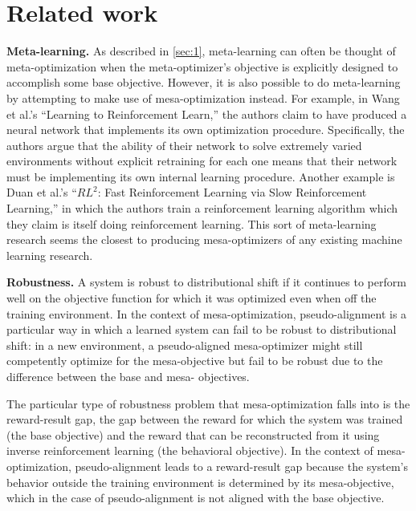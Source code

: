 \documentclass[
  onecolumn,
  natbib,
]{miri-tech-article}
\begin{document}
\section{Related work}
\label{sec:5}

\textbf{Meta-learning.} As described in \cref{sec:1}, meta-learning can often be thought of meta-optimization when the meta-optimizer's objective is explicitly designed to accomplish some base objective. However, it is also possible to do meta-learning by attempting to make use of mesa-optimization instead. For example, in Wang et al.'s ``Learning to Reinforcement Learn,'' the authors claim to have produced a neural network that implements its own optimization procedure.\cite{learn_to_rl} Specifically, the authors argue that the ability of their network to solve extremely varied environments without explicit retraining for each one means that their network must be implementing its own internal learning procedure. Another example is Duan et al.'s ``$RL^2$: Fast Reinforcement Learning via Slow Reinforcement Learning,'' in which the authors train a reinforcement learning algorithm which they claim is itself doing reinforcement learning.\cite{rl2} This sort of meta-learning research seems the closest to producing mesa-optimizers of any existing machine learning research.

\textbf{Robustness.} A system is robust to distributional shift if it continues to perform well on the objective function for which it was optimized even when off the training environment.\cite{concrete_problems} In the context of mesa-optimization, pseudo-alignment is a particular way in which a learned system can fail to be robust to distributional shift: in a new environment, a pseudo-aligned mesa-optimizer might still competently optimize for the mesa-objective but fail to be robust due to the difference between the base and mesa- objectives.

The particular type of robustness problem that mesa-optimization falls into is the reward-result gap, the gap between the reward for which the system was trained (the base objective) and the reward that can be reconstructed from it using inverse reinforcement learning (the behavioral objective).\cite{leike} In the context of mesa-optimization, pseudo-alignment leads to a reward-result gap because the system's behavior outside the training environment is determined by its mesa-objective, which in the case of pseudo-alignment is not aligned with the base objective.
\end{document}
